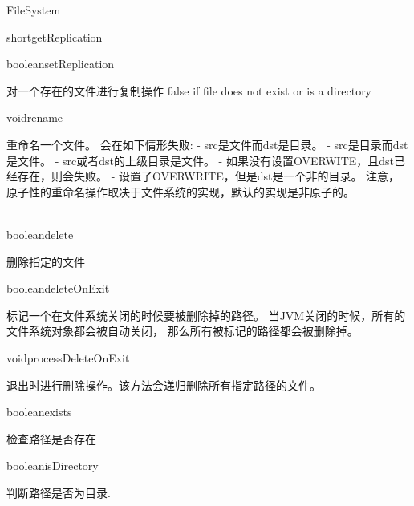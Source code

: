\begin{XeClass}{FileSystem}
\begin{XeMethod}{\XePublic}{short}{getReplication}
    \end{XeMethod}

    \begin{XeMethod}{\XePublic}{boolean}{setReplication}
         
 对一个存在的文件进行复制操作
 false if file does not exist or is a directory

    \end{XeMethod}

    \begin{XeMethod}{\XeProtected}{void}{rename}
         
 重命名一个文件。
 会在如下情形失败:
 - src是文件而dst是目录。
 - src是目录而dst是文件。
 - src或者dst的上级目录是文件。
 - 如果没有设置OVERWITE，且dst已经存在，则会失败。
 - 设置了OVERWRITE，但是dst是一个非的目录。
 注意，原子性的重命名操作取决于文件系统的实现，默认的实现是非原子的。

    \end{XeMethod}

    \begin{XeMethod}{\XePublic \\ \XeAbstract}{boolean}{delete}
         
 删除指定的文件

    \end{XeMethod}

    \begin{XeMethod}{\XePublic}{boolean}{deleteOnExit}
         
 标记一个在文件系统关闭的时候要被删除掉的路径。
 当JVM关闭的时候，所有的文件系统对象都会被自动关闭，
 那么所有被标记的路径都会被删除掉。

    \end{XeMethod}

    \begin{XeMethod}{\XeProtected}{void}{processDeleteOnExit}
         
 退出时进行删除操作。该方法会递归删除所有指定路径的文件。

    \end{XeMethod}

    \begin{XeMethod}{\XePublic}{boolean}{exists}
         
 检查路径是否存在

    \end{XeMethod}

    \begin{XeMethod}{\XePublic}{boolean}{isDirectory}
         
 判断路径是否为目录.


\end{XeMethod}
\end{XeClass}
